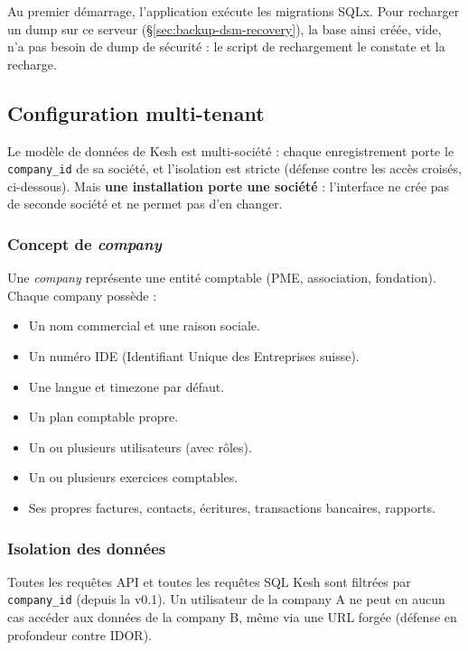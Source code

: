 \documentclass[a4paper,11pt,oneside]{article}
\begin{document}
Au premier démarrage, l'application exécute les migrations SQLx. Pour recharger un dump sur ce serveur (\S\ref{sec:backup-dsm-recovery}), la base ainsi créée, vide, n'a pas besoin de dump de sécurité : le script de rechargement le constate et la recharge.

\subsection{Configuration multi-tenant}

Le modèle de données de Kesh est multi-société : chaque enregistrement porte le \texttt{company\_id} de sa société, et l'isolation est stricte (défense contre les accès croisés, ci-dessous). Mais \textbf{une installation porte une société} : l'interface ne crée pas de seconde société et ne permet pas d'en changer.

\subsubsection{Concept de \emph{company}}

Une \emph{company} représente une entité comptable (PME, association, fondation). Chaque company possède :

\begin{itemize}
    \item Un nom commercial et une raison sociale.
    \item Un numéro IDE (Identifiant Unique des Entreprises suisse).
    \item Une langue et timezone par défaut.
    \item Un plan comptable propre.
    \item Un ou plusieurs utilisateurs (avec rôles).
    \item Un ou plusieurs exercices comptables.
    \item Ses propres factures, contacts, écritures, transactions bancaires, rapports.
\end{itemize}

\subsubsection{Isolation des données}

Toutes les requêtes API et toutes les requêtes SQL Kesh sont filtrées par \texttt{company\_id} (depuis la v0.1). Un utilisateur de la company A ne peut en aucun cas accéder aux données de la company B, même via une URL forgée (défense en profondeur contre IDOR).
\end{document}
